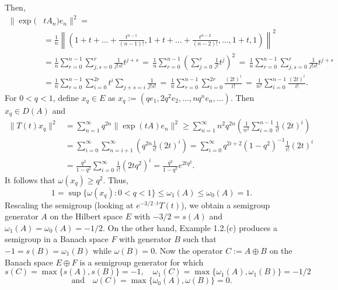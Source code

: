 \begin{example}
Then,
\begin{align*}
\|\exp(&t A_n) e_n\|^2 = \\
&= \frac{1}{n} \left\| (1 + t + \dots + \frac{t^{n-1}}{(n-1)!}, 1 + t + \dots + \frac{t^{n-2}}{(n-2)!}, \dots, 1+t, 1) \right\|^2 \\
&=
\frac{1}{n} \sum_{r=0}^{n-1} \sum_{j,s=0}^{r} \frac{1}{j!s!} t^{j+s} \, = \,
\frac{1}{n} \sum_{r=0}^{n-1} \left(\sum_{j=0}^{r} \frac{1}{j!} t^j \right)^2 
\, = \, \frac{1}{n} \sum_{r=0}^{n-1} \sum_{j,s=0}^{r} \frac{1}{j!s!} t^{j+s} \\
&= 
\frac{1}{n} \sum_{r=0}^{n-1} \sum_{i=0}^{2r} t^i \sum_{j+s=i} \frac{1}{j!s!} \,
= \, 
\frac{1}{n} \sum_{r=0}^{n-1} \sum_{i=0}^{2r} \frac{(2t)^i}{i!} \,  = \,  \frac{1}{n^2} \sum_{i=0}^{n-1} \frac{(2t)^i}{i!}.
\end{align*}
 For $ 0 < q < 1 $, define $ x_q \in E $ as  
$
x_q := (q e_1, 2q^2 e_2, ..., n q^n e_n, ...).
$
Then $x_q \in D(A)$ and
\begin{align*}
\|T(t)x_q\|^2 & = \sum_{n=1}^{\infty} q^{2n} \| \exp(t A) e_n \|^2
\geq \sum_{n=1}^{\infty} n^2 q^{2n} \left(\frac{1}{n^2} \sum_{i=0}^{n-1}  \frac{1}{i!} (2t)^i \right)\\
&= \sum_{i=0}^{\infty} \sum_{n=i+1}^{\infty} \left( q^{2n} \frac{1}{i!} (2t)^i \right)
= \sum_{i=0}^{\infty} q^{2i+2} (1 - q^2)^{-1} \frac{1}{i!} (2t)^i \\
&= \frac{q^2}{1 - q^2} \sum_{i=0}^{\infty} \frac{1}{i!} (2t q^2)^i
= \frac{q^2}{1 - q^2} e^{2t q^2}.
\end{align*}
It follows that $\omega(x_q) \geq q^2$. 
Thus,
\[
1 = \sup \{\omega(x_q) : 0 < q < 1\} \leq \omega_1(A) \leq \omega_0(A) = 1.
\]
Rescaling the semigroup (\ie looking at $e^{-3/2 \cdot t} T(t)$), we obtain a semigroup generator $A$ on the Hilbert space $E$ with $-3/2 = s(A)$ and $\omega_1(A) = \omega_0(A) = -1/2$. 
On the other hand, Example 1.2.(c) produces a semigroup in a Banach space $F$ with generator $B$ such that $-1 = s(B) = \omega_1(B)$ while $\omega(B) = 0$. 
Now the operator $C := A \oplus B$ on the Banach space $E \oplus F$ is a semigroup generator for which
\[
s(C) = \max \{s(A), s(B)\} = -1, \quad \omega_1(C) = \max\{\omega_1(A), \omega_1(B)\} = -1/2
\]
\[
\text{and} \quad \omega(C) = \max\{\omega_0(A), \omega(B)\} = 0.
\]
\end{example}

